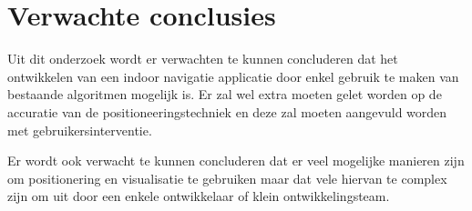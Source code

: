 \section{Verwachte conclusies}
\label{sec:verwachte_conclusies}
Uit dit onderzoek wordt er verwachten te kunnen concluderen dat het ontwikkelen van een indoor navigatie applicatie door enkel gebruik te maken van bestaande algoritmen mogelijk is. Er zal wel extra moeten gelet worden op de accuratie van de positioneeringstechniek en deze zal moeten aangevuld worden met gebruikersinterventie.

Er wordt ook verwacht te kunnen concluderen dat er veel mogelijke manieren zijn om positionering en visualisatie te gebruiken maar dat vele hiervan te complex zijn om uit door een enkele ontwikkelaar of klein ontwikkelingsteam.
